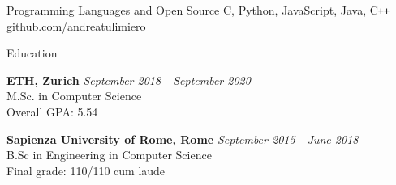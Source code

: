 \documentclass{resume}
\begin{document}

\begin{rSection}{Programming Languages and Open Source}
C, Python, JavaScript, Java, C\texttt{++} \hfill \href{https://github.com/andreatulimiero}{github.com/andreatulimiero}
\end{rSection}


\begin{rSection}{Education}

{\bf ETH, Zurich} \hfill {\em September 2018 - September 2020} \\ 
M.Sc. in Computer Science\\
Overall GPA: 5.54

{\bf Sapienza University of Rome, Rome} \hfill {\em September 2015 - June 2018} \\ 
B.Sc in Engineering in Computer Science\\
Final grade: 110/110 cum laude

\end{rSection}

\end{document}
